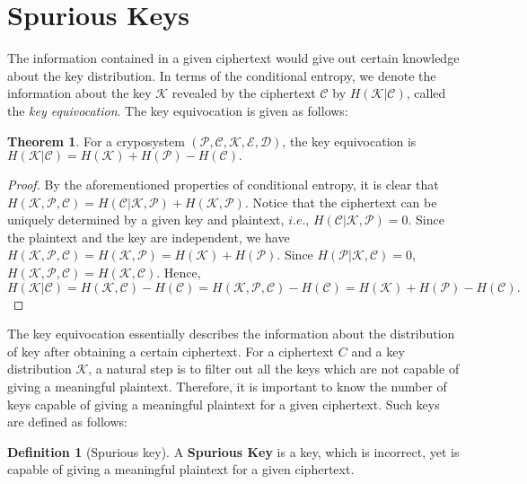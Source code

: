 \documentclass[letterpaper, 10 pt, conference]{ieeeconf}  %
\theoremstyle{definition}
\newtheorem{definition}{Definition}[section]
\theoremstyle{property}
\newtheorem{theorem}{Theorem}
\begin{document}

\section{Spurious Keys}
The information contained in a given ciphertext would give out certain knowledge about the key distribution. In terms of the conditional entropy, we denote the information about the key $\mathcal{K}$ revealed by the ciphertext $\mathcal{C}$ by $H(\mathcal{K}|\mathcal{C})$, called the \textit{key equivocation}. The key equivocation is given as follows:
\begin{theorem}
\label{theorem:hkc_equality}
For a cryposystem $(\mathcal{P}, \mathcal{C}, \mathcal{K}, \mathcal{E}, \mathcal{D})$, the key equivocation is $H(\mathcal{K}|\mathcal{C}) = H(\mathcal{K})+H(\mathcal{P})-H(\mathcal{C}).$
\end{theorem}

\begin{proof}
\label{proof:key_equivocation}
By the aforementioned properties of conditional entropy, it is clear that $H(\mathcal{K}, \mathcal{P}, \mathcal{C}) = H(\mathcal{C}|\mathcal{K}, \mathcal{P})+H(\mathcal{K}, \mathcal{P})$. Notice that the ciphertext can be uniquely determined by a given key and plaintext, $i.e.$, $H(\mathcal{C}|\mathcal{K}, \mathcal{P}) = 0$. Since the plaintext and the key are independent, we have $H(\mathcal{K}, \mathcal{P}, \mathcal{C}) = H(\mathcal{K}, \mathcal{P}) = H(\mathcal{K})+H(\mathcal{P})$. Since $H(\mathcal{P}|\mathcal{K}, \mathcal{C}) = 0$, $H(\mathcal{K}, \mathcal{P}, \mathcal{C}) = H(\mathcal{K}, \mathcal{C})$. Hence, $H(\mathcal{K}|\mathcal{C}) = H(\mathcal{K}, \mathcal{C})-H(\mathcal{C}) = H(\mathcal{K}, \mathcal{P}, \mathcal{C})-H(\mathcal{C}) = H(\mathcal{K})+H(\mathcal{P})-H(\mathcal{C}).$
\end{proof}

The key equivocation essentially describes the information about the distribution of key after obtaining a certain ciphertext. For a ciphertext $C$ and a key distribution $\mathcal{K}$, a natural step is to filter out all the keys which are not capable of giving a meaningful plaintext. Therefore, it is important to know the number of keys capable of giving a meaningful plaintext for a given ciphertext. Such keys are defined as follows:

\begin{definition}[Spurious key]
\label{def:spurious_key}
A \textbf{Spurious Key} is a key, which is incorrect, yet is capable of giving a meaningful plaintext for a given ciphertext.
\end{definition}
\end{document}
